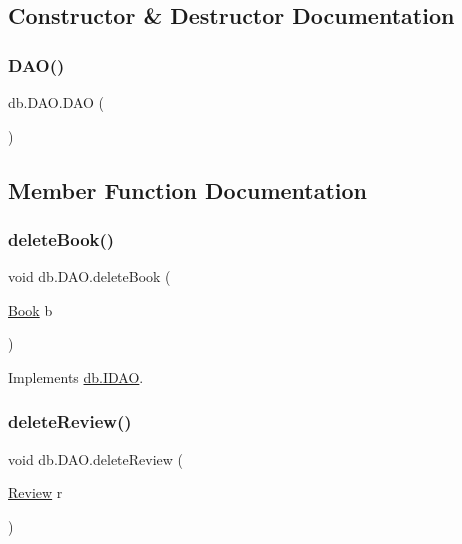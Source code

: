 \subsection{Constructor \& Destructor Documentation}
\mbox{\label{classdb_1_1_d_a_o_abd016ae9834e8d5e94d96f551d1636e7}} 
\subsubsection{\texorpdfstring{D\+A\+O()}{DAO()}}
{\footnotesize\ttfamily db.\+D\+A\+O.\+D\+AO (\begin{DoxyParamCaption}{ }\end{DoxyParamCaption})}



\subsection{Member Function Documentation}
\mbox{\label{classdb_1_1_d_a_o_a65f6a816c5f6dfb07178daf490f56fdc}} 
\subsubsection{\texorpdfstring{delete\+Book()}{deleteBook()}}
{\footnotesize\ttfamily void db.\+D\+A\+O.\+delete\+Book (\begin{DoxyParamCaption}\item[{\hyperlink{classserver_1_1data_1_1_book}{Book}}]{b }\end{DoxyParamCaption})}



Implements \hyperlink{interfacedb_1_1_i_d_a_o_a1d6c98ea794177d7fd12c4a028ec29c1}{db.\+I\+D\+AO}.

\mbox{\label{classdb_1_1_d_a_o_aa033f83155deb72d59492bcb2b8e4d3a}} 
\subsubsection{\texorpdfstring{delete\+Review()}{deleteReview()}}
{\footnotesize\ttfamily void db.\+D\+A\+O.\+delete\+Review (\begin{DoxyParamCaption}\item[{\hyperlink{classserver_1_1data_1_1_review}{Review}}]{r }\end{DoxyParamCaption})}



